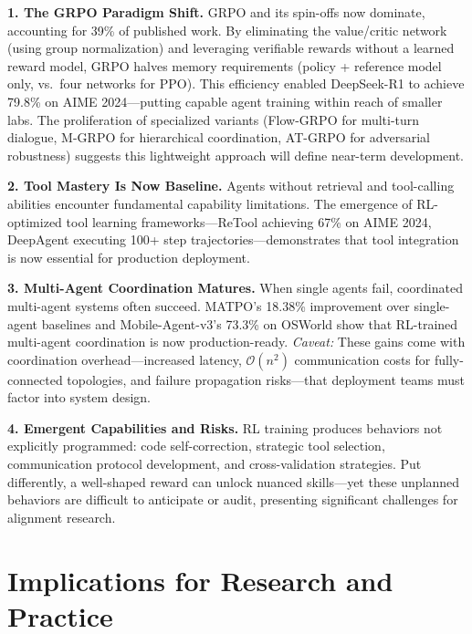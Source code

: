 \documentclass[12pt,a4paper]{report}
\theoremstyle{definition}
\begin{document}
\noindent\textbf{1. The GRPO Paradigm Shift.} GRPO and its spin-offs now dominate, accounting for 39\% of published work. By eliminating the value/critic network (using group normalization) and leveraging verifiable rewards without a learned reward model, GRPO halves memory requirements (policy + reference model only, vs.\ four networks for PPO). This efficiency enabled DeepSeek-R1 to achieve 79.8\% on AIME 2024---putting capable agent training within reach of smaller labs. The proliferation of specialized variants (Flow-GRPO for multi-turn dialogue, M-GRPO for hierarchical coordination, AT-GRPO for adversarial robustness) suggests this lightweight approach will define near-term development.

\noindent\textbf{2. Tool Mastery Is Now Baseline.} Agents without retrieval and tool-calling abilities encounter fundamental capability limitations. The emergence of RL-optimized tool learning frameworks---ReTool achieving 67\% on AIME 2024, DeepAgent executing 100+ step trajectories---demonstrates that tool integration is now essential for production deployment.

\noindent\textbf{3. Multi-Agent Coordination Matures.} When single agents fail, coordinated multi-agent systems often succeed. MATPO's 18.38\% improvement over single-agent baselines and Mobile-Agent-v3's 73.3\% on OSWorld show that RL-trained multi-agent coordination is now production-ready. \textit{Caveat:} These gains come with coordination overhead---increased latency, $\mathcal{O}(n^2)$ communication costs for fully-connected topologies, and failure propagation risks---that deployment teams must factor into system design.

\noindent\textbf{4. Emergent Capabilities and Risks.} RL training produces behaviors not explicitly programmed: code self-correction, strategic tool selection, communication protocol development, and cross-validation strategies. Put differently, a well-shaped reward can unlock nuanced skills---yet these unplanned behaviors are difficult to anticipate or audit, presenting significant challenges for alignment research.

\section*{Implications for Research and Practice}
\end{document}

